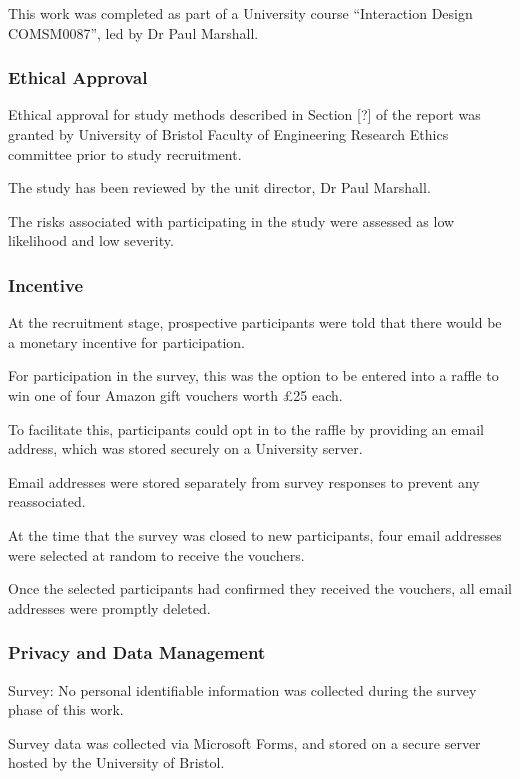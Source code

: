 \documentclass[manuscript,screen,review]{acmart}
\begin{document}
This work was completed as part of a University course “Interaction Design COMSM0087”, led by Dr Paul Marshall.


\subsubsection{Ethical Approval} 


Ethical approval for study methods described in Section [?] of the report was granted by University of Bristol Faculty of Engineering Research Ethics committee prior to study recruitment.

The study has been reviewed by the unit director, Dr Paul Marshall.

The risks associated with participating in the study were assessed as low likelihood and low severity. 

\subsubsection{Incentive}  


At the recruitment stage, prospective participants were told that there would be a monetary incentive for participation.

For participation in the survey, this was the option to be entered into a raffle to win one of four Amazon gift vouchers worth £25 each.

To facilitate this, participants could opt in to the raffle by providing an email address, which was stored securely on a University server. 

Email addresses were stored separately from survey responses to prevent any reassociated. 

At the time that the survey was closed to new participants, four email addresses were selected at random to receive the vouchers.

Once the selected participants had confirmed they received the vouchers, all email addresses were promptly deleted. 



\subsubsection{Privacy and Data Management}  


Survey:
No personal identifiable information was collected during the survey phase of this work.

Survey data was collected via Microsoft Forms, and stored on a secure server hosted by the University of Bristol.
\end{document}
